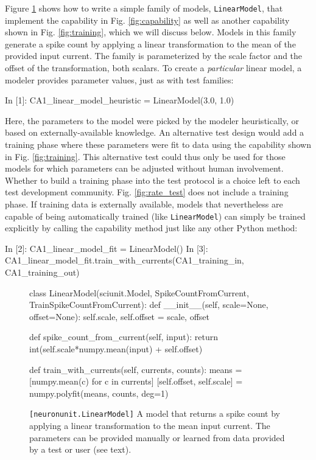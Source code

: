 \documentclass{frontiersSCNS}
\let\verbx\lstinline
\begin{document}
Figure \ref{fig:simple_model} shows how to write a simple {family} of models, \verbx{LinearModel}, that implement the capability in Fig. \ref{fig:capability} as well as another capability shown in Fig. \ref{fig:training}, which we will discuss below. 
Models in this family generate a spike count by applying a linear transformation to the mean of the provided input current. 
The family is parameterized by the scale factor and the offset of the transformation, both scalars. 
To create a \emph{particular} linear model, a modeler provides parameter values, just as with test families:
\begin{ipy}
  In [1]: CA1_linear_model_heuristic = LinearModel(3.0, 1.0)
\end{ipy}
Here, the parameters to the model were picked by the modeler heuristically, or based on externally-available knowledge. 
An alternative test design would add a training phase where these parameters were fit to data using the capability shown in Fig. \ref{fig:training}. 
This alternative test could thus only be used for those models for which parameters can be adjusted without human involvement. 
Whether to build a training phase into the test protocol is a choice left to each test development community. 
Fig. \ref{fig:rate_test} does not include a training phase. 
If training data is externally available, models that nevertheless are capable of being automatically trained (like \verb|LinearModel|) can simply be trained explicitly by calling the capability method just like any other Python method:
\begin{ipy}
  In [2]: CA1_linear_model_fit = LinearModel()
  In [3]: CA1_linear_model_fit.train_with_currents(CA1_training_in, CA1_training_out)
\end{ipy}
\begin{figure}
\begin{python}
class LinearModel(sciunit.Model, SpikeCountFromCurrent, 
    TrainSpikeCountFromCurrent):
  def __init__(self, scale=None, offset=None): 
    self.scale, self.offset = scale, offset
    
  def spike_count_from_current(self, input):
    return int(self.scale*numpy.mean(input) + self.offset)

  def train_with_currents(self, currents, counts):
    means = [numpy.mean(c) for c in currents]
    [self.offset, self.scale] = numpy.polyfit(means, counts, deg=1)    
\end{python}
\vspace{-15px}
\caption{\texttt{[neuronunit.LinearModel]} A model that returns a spike count by applying a linear transformation to the mean input current. The parameters can be provided manually or learned from data provided by a test or user (see text).}
\label{fig:simple_model}
\vspace{-10px}
\end{figure}
\end{document}
